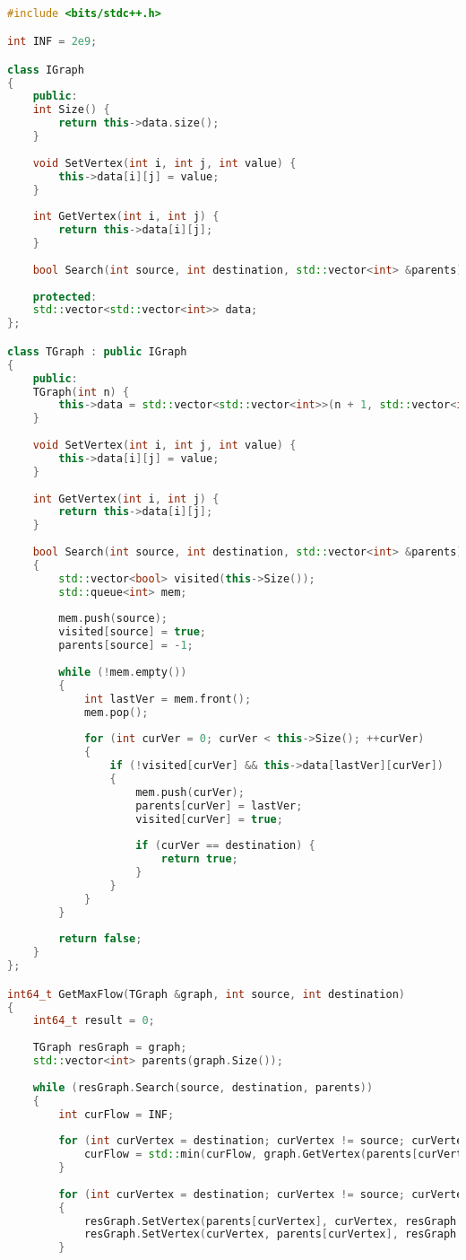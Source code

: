 \begin{lstlisting}[language=C++]

#include <bits/stdc++.h>

int INF = 2e9;

class IGraph
{
	public:
	int Size() {
		return this->data.size();
	}
	
	void SetVertex(int i, int j, int value) {
		this->data[i][j] = value;
	}
	
	int GetVertex(int i, int j) {
		return this->data[i][j];
	}
	
	bool Search(int source, int destination, std::vector<int> &parents);
	
	protected:
	std::vector<std::vector<int>> data;
};

class TGraph : public IGraph
{
	public:
	TGraph(int n) {
		this->data = std::vector<std::vector<int>>(n + 1, std::vector<int>(n + 1));
	}
	
	void SetVertex(int i, int j, int value) {
		this->data[i][j] = value;
	}
	
	int GetVertex(int i, int j) {
		return this->data[i][j];
	}
	
	bool Search(int source, int destination, std::vector<int> &parents)
	{
		std::vector<bool> visited(this->Size());
		std::queue<int> mem;
		
		mem.push(source);
		visited[source] = true;
		parents[source] = -1; 
		
		while (!mem.empty()) 
		{
			int lastVer = mem.front();
			mem.pop();
			
			for (int curVer = 0; curVer < this->Size(); ++curVer) 
			{
				if (!visited[curVer] && this->data[lastVer][curVer]) 
				{
					mem.push(curVer);
					parents[curVer] = lastVer;
					visited[curVer] = true;
					
					if (curVer == destination) {
						return true;
					}
				}
			}
		}
		
		return false;
	}
};

int64_t GetMaxFlow(TGraph &graph, int source, int destination)
{
	int64_t result = 0;
	
	TGraph resGraph = graph;
	std::vector<int> parents(graph.Size());
	
	while (resGraph.Search(source, destination, parents)) 
	{
		int curFlow = INF;
		
		for (int curVertex = destination; curVertex != source; curVertex = parents[curVertex]) {
			curFlow = std::min(curFlow, graph.GetVertex(parents[curVertex], curVertex));
		}
		
		for (int curVertex = destination; curVertex != source; curVertex = parents[curVertex]) 
		{
			resGraph.SetVertex(parents[curVertex], curVertex, resGraph.GetVertex(parents[curVertex], curVertex) - curFlow);
			resGraph.SetVertex(curVertex, parents[curVertex], resGraph.GetVertex(curVertex, parents[curVertex]) + curFlow);
		}
		

\end{lstlisting}

